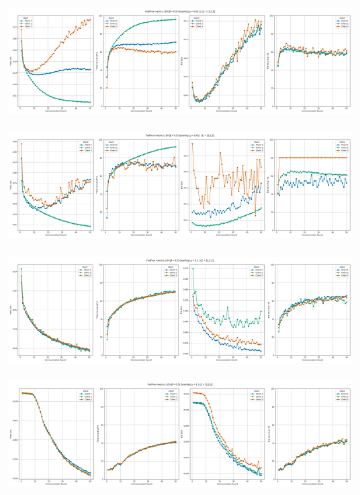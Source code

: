 \begin{figure}[H]
    \centering

    \begin{subfigure}{\linewidth}
        \centering
        \includegraphics[width=0.8\linewidth]{figures/2-Federated_Learning/FedProx_QuantitySkew_Dir_05_Mu_0.001.png}
    \end{subfigure}
    \vspace{1em} %

    \begin{subfigure}{\linewidth}
        \centering
        \includegraphics[width=0.8\linewidth]{figures/2-Federated_Learning/FedProx_QuantitySkew_Dir_05_Mu_0.01.png}
    \end{subfigure}
    \vspace{1em} %

    \begin{subfigure}{\linewidth}
        \centering
        \includegraphics[width=0.8\linewidth]{figures/2-Federated_Learning/FedProx_QuantitySkew_Dir_05_Mu_0.1.png}
    \end{subfigure}
    \vspace{1em} %

    \begin{subfigure}{\linewidth}
        \centering
        \includegraphics[width=0.8\linewidth]{figures/2-Federated_Learning/FedProx_QuantitySkew_Dir_05_Mu_1.png}
    \end{subfigure}


\end{figure}
